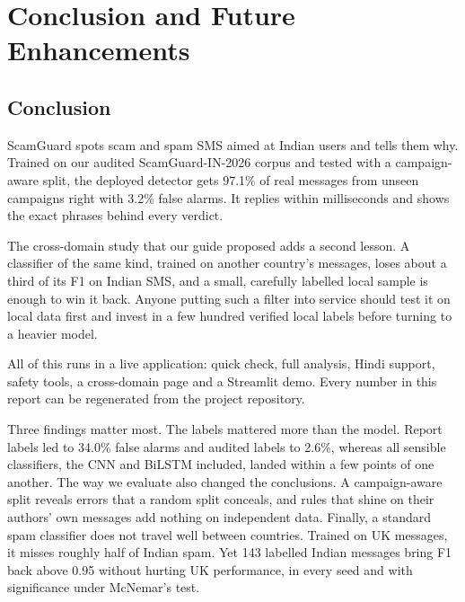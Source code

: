 \chapter{Conclusion and Future Enhancements}
\section{Conclusion}
ScamGuard spots scam and spam SMS aimed at Indian users and tells them why. Trained on our audited ScamGuard-IN-2026 corpus and tested with a campaign-aware split, the deployed detector gets 97.1\% of real messages from unseen campaigns right with 3.2\% false alarms. It replies within milliseconds and shows the exact phrases behind every verdict.

The cross-domain study that our guide proposed adds a second lesson. A classifier of the same kind, trained on another country's messages, loses about a third of its F1 on Indian SMS, and a small, carefully labelled local sample is enough to win it back. Anyone putting such a filter into service should test it on local data first and invest in a few hundred verified local labels before turning to a heavier model.

All of this runs in a live application: quick check, full analysis, Hindi support, safety tools, a cross-domain page and a Streamlit demo. Every number in this report can be regenerated from the project repository.

Three findings matter most. The labels mattered more than the model. Report labels led to 34.0\% false alarms and audited labels to 2.6\%, whereas all sensible classifiers, the CNN and BiLSTM included, landed within a few points of one another. The way we evaluate also changed the conclusions. A campaign-aware split reveals errors that a random split conceals, and rules that shine on their authors' own messages add nothing on independent data. Finally, a standard spam classifier does not travel well between countries. Trained on UK messages, it misses roughly half of Indian spam. Yet 143 labelled Indian messages bring F1 back above 0.95 without hurting UK performance, in every seed and with significance under McNemar's test.


